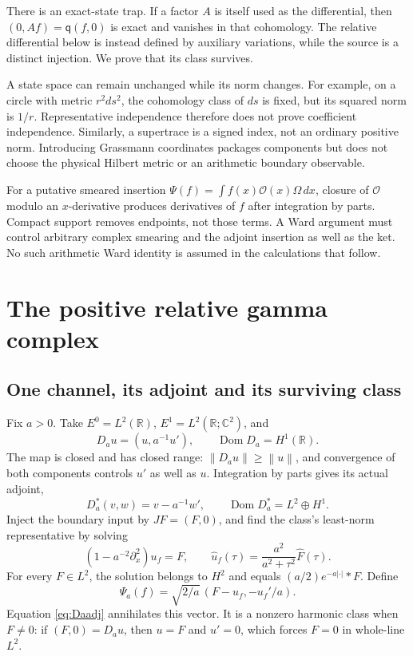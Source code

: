\documentclass[11pt]{article}
\numberwithin{equation}{section}
\theoremstyle{definition}
\theoremstyle{remark}
\newcommand{\R}{\mathbb R}
\newcommand{\C}{\mathbb C}
\newcommand{\Dom}{\operatorname{Dom}}
\newcommand{\qq}{\mathsf q}
\newcommand{\norm}[1]{\left\lVert#1\right\rVert}
\begin{document}
There is an exact-state trap. If a factor $A$ is itself used as the differential, then $(0,Af)=\qq(f,0)$ is exact and vanishes in that cohomology. The relative differential below is instead defined by auxiliary variations, while the source is a distinct injection. We prove that its class survives.

A state space can remain unchanged while its norm changes. For example, on a circle with metric $r^2ds^2$, the cohomology class of $ds$ is fixed, but its squared norm is $1/r$. Representative independence therefore does not prove coefficient independence. Similarly, a supertrace is a signed index, not an ordinary positive norm. Introducing Grassmann coordinates packages components but does not choose the physical Hilbert metric or an arithmetic boundary observable.

For a putative smeared insertion $\Psi(f)=\int f(x)\mathcal O(x)\Omega\,dx$, closure of $\mathcal O$ modulo an $x$-derivative produces derivatives of $f$ after integration by parts. Compact support removes endpoints, not those terms. A Ward argument must control arbitrary complex smearing and the adjoint insertion as well as the ket. No such arithmetic Ward identity is assumed in the calculations that follow.

\section{The positive relative gamma complex}
\label{sec:gamma}
\subsection{One channel, its adjoint and its surviving class}
Fix $a>0$. Take $E^0=L^2(\R)$, $E^1=L^2(\R;\C^2)$, and
\begin{equation}
 D_au=(u,a^{-1}u'),\qquad\Dom D_a=H^1(\R).
 \label{eq:Da}
\end{equation}
The map is closed and has closed range: $\norm{D_au}\ge\norm u$, and convergence of both components controls $u'$ as well as $u$. Integration by parts gives its actual adjoint,
\begin{equation}
 D_a^*(v,w)=v-a^{-1}w',\qquad\Dom D_a^*=L^2\oplus H^1.
 \label{eq:Daadj}
\end{equation}
Inject the boundary input by $JF=(F,0)$, and find the class's least-norm representative by solving
\begin{equation}
 (1-a^{-2}\partial_x^2)u_f=F,
 \qquad
 \widehat u_f(\tau)=\frac{a^2}{a^2+\tau^2}\widehat F(\tau).
 \label{eq:uf}
\end{equation}
For every $F\in L^2$, the solution belongs to $H^2$ and equals $(a/2)e^{-a|\cdot|}*F$. Define
\begin{equation}
 \Psi_a(f)=\sqrt{2/a}\,(F-u_f,-u_f'/a).
 \label{eq:psia}
\end{equation}
Equation \eqref{eq:Daadj} annihilates this vector. It is a nonzero harmonic class when $F\ne0$: if $(F,0)=D_au$, then $u=F$ and $u'=0$, which forces $F=0$ in whole-line $L^2$.
\end{document}
